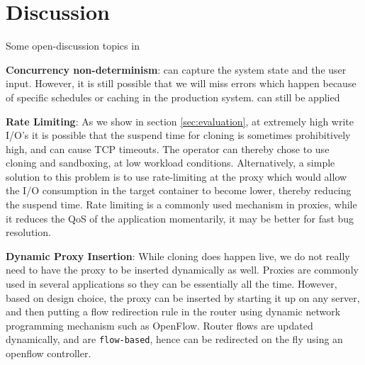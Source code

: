 \section{Discussion}
\label{sec:discussion}

Some open-discussion topics in \parikshan 

\textbf{Concurrency non-determinism}: \parikshan can capture the system state and the user input.
However, it is still possible that we will miss errors which happen because of specific schedules or caching in the production system.
\parikshan can still be applied 


\textbf{Rate Limiting}: As we show in section \ref{sec:evaluation}, at extremely high write I/O's it is possible that the suspend time for cloning is sometimes prohibitively high, and can cause TCP timeouts. 
The operator can thereby chose to use cloning and sandboxing, at low workload conditions. 
Alternatively, a simple solution to this problem is to use rate-limiting at the proxy which would allow the I/O consumption in the target container to become lower, thereby reducing the suspend time.
Rate limiting is a commonly used mechanism in proxies, while it reduces the QoS of the application momentarily, it may be better for fast bug resolution.


\textbf{Dynamic Proxy Insertion}: While cloning does happen live, we do not really need to have the proxy to be inserted dynamically as well. 
Proxies are commonly used in several applications so they can be essentially all the time. 
However, based on design choice, the proxy can be inserted by starting it up on any server, and then putting a flow redirection rule in the router using dynamic network programming mechanism such as OpenFlow\cite{openflow}.
Router flows are updated dynamically, and are \texttt{flow-based}, hence can be redirected on the fly using an openflow\cite{openflow} controller.



